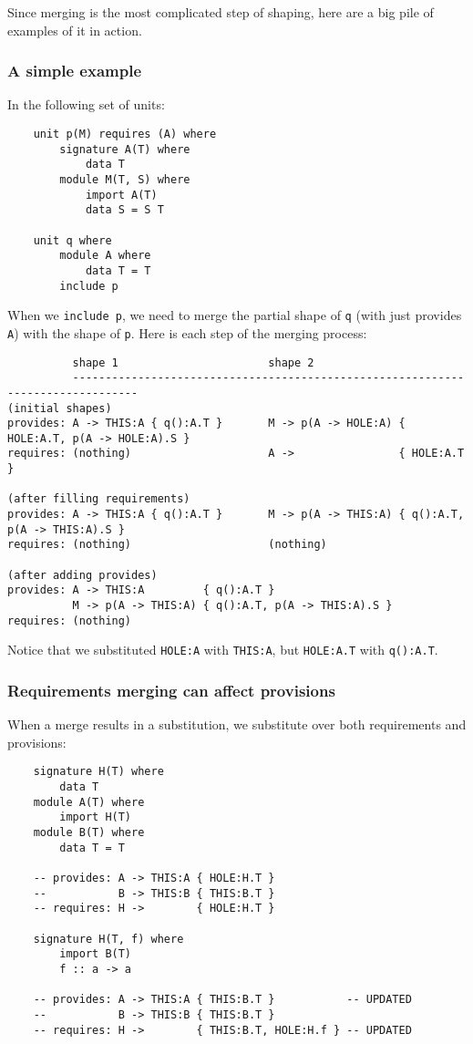 \documentclass{article}
\begin{document}
Since merging is the most complicated step of shaping, here are a big
pile of examples of it in action.

\subsubsection{A simple example}

In the following set of units:

\begin{verbatim}
    unit p(M) requires (A) where
        signature A(T) where
            data T
        module M(T, S) where
            import A(T)
            data S = S T

    unit q where
        module A where
            data T = T
        include p
\end{verbatim}

When we \verb|include p|, we need to merge the partial shape
of \verb|q| (with just provides \verb|A|) with the shape
of \verb|p|.  Here is each step of the merging process:

\begin{verbatim}
          shape 1                       shape 2
          --------------------------------------------------------------------------------
(initial shapes)
provides: A -> THIS:A { q():A.T }       M -> p(A -> HOLE:A) { HOLE:A.T, p(A -> HOLE:A).S }
requires: (nothing)                     A ->                { HOLE:A.T }

(after filling requirements)
provides: A -> THIS:A { q():A.T }       M -> p(A -> THIS:A) { q():A.T, p(A -> THIS:A).S }
requires: (nothing)                     (nothing)

(after adding provides)
provides: A -> THIS:A         { q():A.T }
          M -> p(A -> THIS:A) { q():A.T, p(A -> THIS:A).S }
requires: (nothing)
\end{verbatim}

Notice that we substituted \verb|HOLE:A| with \verb|THIS:A|, but \verb|HOLE:A.T| with \verb|q():A.T|.

\subsubsection{Requirements merging can affect provisions}

When a merge results in a substitution, we substitute over both
requirements and provisions:

\begin{verbatim}
    signature H(T) where
        data T
    module A(T) where
        import H(T)
    module B(T) where
        data T = T

    -- provides: A -> THIS:A { HOLE:H.T }
    --           B -> THIS:B { THIS:B.T }
    -- requires: H ->        { HOLE:H.T }

    signature H(T, f) where
        import B(T)
        f :: a -> a

    -- provides: A -> THIS:A { THIS:B.T }           -- UPDATED
    --           B -> THIS:B { THIS:B.T }
    -- requires: H ->        { THIS:B.T, HOLE:H.f } -- UPDATED
\end{verbatim}
\end{document}
